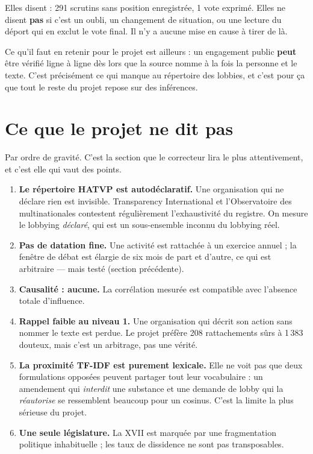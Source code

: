 \documentclass[11pt,a4paper]{article}
\begin{document}
\begin{encadre}
Elles disent : 291 scrutins sans position enregistrée, 1 vote exprimé. Elles ne disent
\textbf{pas} si c'est un oubli, un changement de situation, ou une lecture du déport qui
en exclut le vote final. Il n'y a aucune mise en cause à tirer de là.

Ce qu'il faut en retenir pour le projet est ailleurs : un engagement public \textbf{peut}
être vérifié ligne à ligne dès lors que la source nomme à la fois la personne et le texte.
C'est précisément ce qui manque au répertoire des lobbies, et c'est pour ça que tout le
reste du projet repose sur des inférences.
\end{encadre}

\newpage
\section{Ce que le projet ne dit pas}

Par ordre de gravité. C'est la section que le correcteur lira le plus attentivement, et
c'est elle qui vaut des points.

\begin{enumerate}
\item \textbf{Le répertoire HATVP est autodéclaratif.} Une organisation qui ne déclare rien
  est invisible. Transparency International et l'Observatoire des multinationales
  contestent régulièrement l'exhaustivité du registre. On mesure le lobbying
  \emph{déclaré}, qui est un sous-ensemble inconnu du lobbying réel.
\item \textbf{Pas de datation fine.} Une activité est rattachée à un exercice annuel ; la
  fenêtre de débat est élargie de six mois de part et d'autre, ce qui est arbitraire ---
  mais testé (section précédente).
\item \textbf{Causalité : aucune.} La corrélation mesurée est compatible avec l'absence
  totale d'influence.
\item \textbf{Rappel faible au niveau 1.} Une organisation qui décrit son action sans
  nommer le texte est perdue. Le projet préfère 208 rattachements sûrs à 1\,383 douteux,
  mais c'est un arbitrage, pas une vérité.
\item \textbf{La proximité TF-IDF est purement lexicale.} Elle ne voit pas que deux
  formulations opposées peuvent partager tout leur vocabulaire : un amendement qui
  \emph{interdit} une substance et une demande de lobby qui la \emph{réautorise} se
  ressemblent beaucoup pour un cosinus. C'est la limite la plus sérieuse du projet.
\item \textbf{Une seule législature.} La XVII\ieme{} est marquée par une fragmentation
  politique inhabituelle ; les taux de dissidence ne sont pas transposables.
\end{enumerate}
\end{document}
